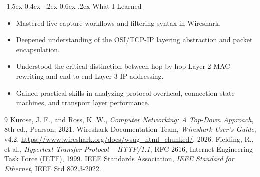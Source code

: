 \documentclass[11pt,a4paper]{article}
\makeatletter
\renewcommand\subsection{\@startsection{subsection}{2}{\z@}%
  {-1.5ex\@plus -0.4ex \@minus -.2ex}%
  {0.6ex \@plus .2ex}%
  {\normalfont\large\bfseries}}
\makeatother
\begin{document}
\subsection{What I Learned}
\begin{itemize}
  \item Mastered live capture workflows and filtering syntax in Wireshark.
  \item Deepened understanding of the OSI/TCP-IP layering abstraction and packet encapsulation.
  \item Understood the critical distinction between hop-by-hop Layer-2 MAC rewriting and end-to-end Layer-3 IP addressing.
  \item Gained practical skills in analyzing protocol overhead, connection state machines, and transport layer performance.
\end{itemize}

\begin{thebibliography}{9}
  Kurose, J. F., and Ross, K. W., \textit{Computer Networking: A Top-Down Approach}, 8th ed., Pearson, 2021.
  Wireshark Documentation Team, \textit{Wireshark User's Guide}, v4.2, \url{https://www.wireshark.org/docs/wsug_html_chunked/}, 2026.
  Fielding, R., et al., \textit{Hypertext Transfer Protocol -- HTTP/1.1}, RFC 2616, Internet Engineering Task Force (IETF), 1999.
  IEEE Standards Association, \textit{IEEE Standard for Ethernet}, IEEE Std 802.3-2022.
\end{thebibliography}
\end{document}
